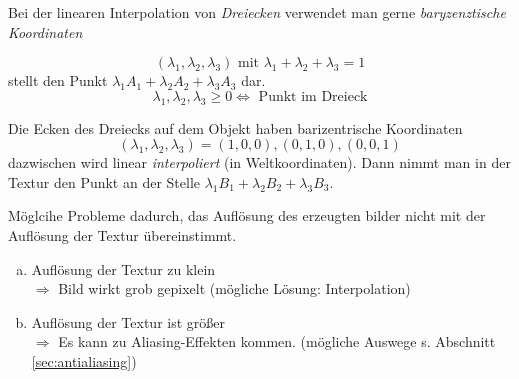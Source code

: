 Bei der linearen Interpolation von \emph{Dreiecken} verwendet man gerne \emph{baryzenztische Koordinaten}
\begin{center}
\end{center}
\[(\lambda_1, \lambda_2, \lambda_3) \text{ mit } \lambda_1 + \lambda_2 + \lambda_3 = 1\]
stellt den Punkt $\lambda_1 A_1 + \lambda_2 A_2 + \lambda_3 A_3$ dar.
\[\lambda_1, \lambda_2, \lambda_3 \ge 0 \Leftrightarrow \text{ Punkt im Dreieck}\]
\begin{center}
\end{center}
Die Ecken des Dreiecks auf dem Objekt haben barizentrische Koordinaten
\[(\lambda_1, \lambda_2, \lambda_3) = (1,0,0), (0,1,0), (0,0,1)\]
dazwischen wird linear \emph{interpoliert} (in Weltkoordinaten). Dann nimmt man in der Textur den Punkt an der
Stelle $\lambda_1 B_1 + \lambda_2 B_2 + \lambda_3 B_3$.
\begin{center}
\end{center}
Möglcihe Probleme dadurch, das Auflösung des erzeugten bilder nicht mit der Auflösung der Textur übereinstimmt.
\begin{enumerate}[a)]
 \item Auflösung der Textur zu klein\\
	$\Rightarrow$ Bild wirkt grob gepixelt (mögliche Lösung: Interpolation)
 \item Auflösung der Textur ist größer\\
	$\Rightarrow$ Es kann zu Aliasing-Effekten kommen. (mögliche Auswege s. Abschnitt \ref{sec:antialiasing})
\end{enumerate}

